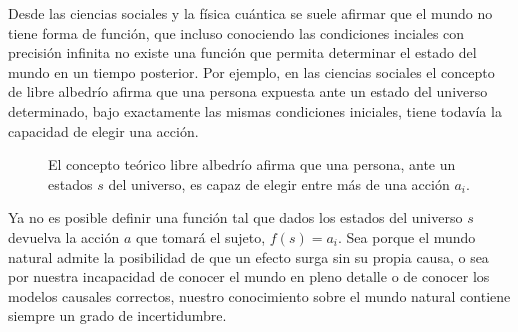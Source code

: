 \documentclass[a4paper,10pt]{book}
\theoremstyle{definition}
\begin{document}
Desde las ciencias sociales y la física cuántica se suele afirmar que el mundo no tiene forma de función, que incluso conociendo las condiciones inciales con precisión infinita no existe una función que permita determinar el estado del mundo en un tiempo posterior.
Por ejemplo, en las ciencias sociales el concepto de libre albedrío afirma que una persona expuesta ante un estado del universo determinado, bajo exactamente las mismas condiciones iniciales, tiene todavía la capacidad de elegir una acción.
\begin{figure}[ht!]
\centering
    \caption{El concepto teórico libre albedrío afirma que una persona, ante un estados $s$ del universo, es capaz de elegir entre más de una acción $a_i$.}
    \label{fig:libre_albedrio}
\end{figure}
Ya no es posible definir una función tal que dados los estados del universo $s$ devuelva la acción $a$ que tomará el sujeto, $f(s) = a_i$.
Sea porque el mundo natural admite la posibilidad de que un efecto surga sin su propia causa, o sea por nuestra incapacidad de conocer el mundo en pleno detalle o de conocer los modelos causales correctos, nuestro conocimiento sobre el mundo natural contiene siempre un grado de incertidumbre.
\end{document}
